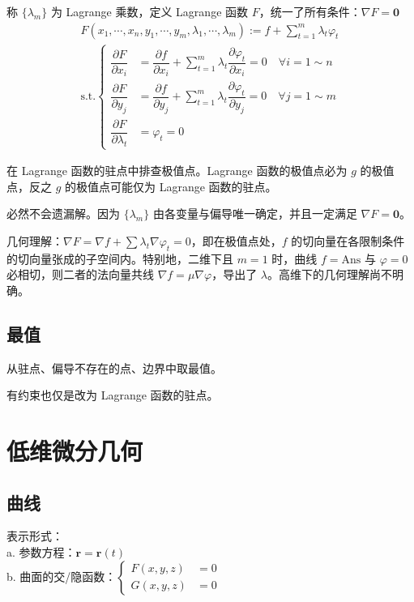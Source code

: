\documentclass[12pt, a4paper, UTF8, openany]{ctexbook}
\newcommand{\mat}[1]{\mathbf{#1}}
\begin{document}
        称 $\{\lambda_m\}$ 为 Lagrange 乘数，定义 Lagrange 函数 $F$，统一了所有条件：$\nabla F = \mat{0}$
        $$\begin{matrix}
            F(x_1, \cdots, x_n, y_1, \cdots, y_m, \lambda_1, \cdots, \lambda_m) := f + \sum\limits_{t = 1}^{m} \lambda_t \varphi_t \\
            \text{s.t.} \begin{cases}
                \dfrac{\partial F}{\partial x_i} &= \dfrac{\partial f}{\partial x_i} + \sum\limits_{t = 1}^{m} \lambda_t \dfrac{\partial \varphi_t}{\partial x_i} = 0 \quad \forall i = 1 \sim n \\
                \dfrac{\partial F}{\partial y_j} &= \dfrac{\partial f}{\partial y_j} + \sum\limits_{t = 1}^{m} \lambda_t \dfrac{\partial \varphi_t}{\partial y_j} = 0 \quad \forall j = 1 \sim m\\
                \dfrac{\partial F}{\partial \lambda_t} &= \varphi_t = 0
            \end{cases}
        \end{matrix}$$

        在 Lagrange 函数的{\heiti 驻点}中排查极值点。Lagrange 函数的极值点必为 $g$ 的极值点，反之 $g$ 的极值点可能仅为 Lagrange 函数的驻点。

        必然不会遗漏解。因为 $\{\lambda_m\}$ 由各变量与偏导唯一确定，并且一定满足 $\nabla F = \mat{0}$。

        几何理解：$\nabla F = \nabla f + \sum \lambda_t \nabla \varphi_t = 0$，即在极值点处，$f$ 的切向量在各限制条件的切向量张成的子空间内。特别地，二维下且 $m = 1$ 时，曲线 $f = \text{Ans}$ 与 $\varphi = 0$ 必相切，则二者的法向量共线 $\nabla f = \mu \nabla \varphi$，导出了 $\lambda$。高维下的几何理解尚不明确。

        \subsection{最值}
        从驻点、偏导不存在的点、边界中取最值。

        有约束也仅是改为 Lagrange 函数的驻点。

    \section{低维微分几何}
        \subsection{曲线}
        表示形式：\\
        a. 参数方程：$\mat{r} = \mat{r}(t)$ \\
        b. 曲面的交/隐函数：$\begin{cases}
            F(x, y, z) &= 0 \\
            G(x, y, z) &= 0
        \end{cases}$
\end{document}
